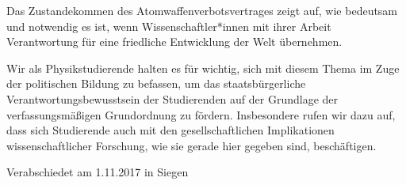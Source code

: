 \documentclass[DIV=calc]{scrartcl}
\begin{document}
Das Zustandekommen des Atomwaffenverbotsvertrages zeigt auf, wie bedeutsam und notwendig es ist, wenn Wissenschaftler*innen mit ihrer Arbeit Verantwortung für eine friedliche Entwicklung der Welt übernehmen.

Wir als Physikstudierende halten es für wichtig, sich mit diesem Thema im Zuge der politischen Bildung zu befassen, um das staatsbürgerliche Verantwortungsbewusstsein der Studierenden auf der Grundlage der verfassungsmäßigen Grundordnung zu fördern. Insbesondere rufen wir dazu auf, dass sich Studierende auch mit den gesellschaftlichen Implikationen wissenschaftlicher Forschung, wie sie gerade hier gegeben sind, beschäftigen.

\vspace{-0.5\baselineskip}
    \begin{flushright}
        Verabschiedet am 1.11.2017 in Siegen
    \end{flushright}
\end{document}
